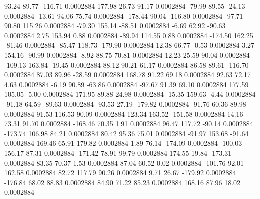        93.24       89.77     -116.71     0.0002884
      177.98       26.73       91.17     0.0002884
      -79.99       89.55      -24.13     0.0002884
      -13.61       94.06       75.74     0.0002884
     -178.44       90.04     -116.80     0.0002884
      -97.71       90.80      115.26     0.0002884
      -79.30      155.14      -88.51     0.0002884
       -6.69       62.92      -90.63     0.0002884
        2.75      153.94        0.88     0.0002884
      -89.94      114.55        0.88     0.0002884
     -174.50      162.25      -81.46     0.0002884
      -85.47      118.73     -179.90     0.0002884
       12.38       66.77       -0.53     0.0002884
        3.27      154.16      -90.99     0.0002884
       -8.92       88.75       70.81     0.0002884
       12.23       25.59       90.04     0.0002884
     -109.13      163.84      -19.45     0.0002884
       88.12       90.21       61.17     0.0002884
       86.58       89.61     -116.70     0.0002884
       87.03       89.96      -28.59     0.0002884
      168.78       91.22       69.18     0.0002884
       92.63       72.17        4.63     0.0002884
       -6.19       90.89      -63.86     0.0002884
      -97.67       91.39       69.10     0.0002884
      177.59      105.05       -5.00     0.0002884
      171.95       89.88       24.98     0.0002884
      -15.35      159.63       -4.44     0.0002884
      -91.18       64.59      -89.63     0.0002884
      -93.53       27.19     -179.82     0.0002884
      -91.76       60.36       89.98     0.0002884
       91.53      116.53       90.09     0.0002884
      123.34      163.52     -151.58     0.0002884
       14.16       73.31       91.70     0.0002884
     -168.46       70.35        1.91     0.0002884
       96.47      117.72      -90.14     0.0002884
     -173.74      106.98       84.21     0.0002884
       80.42       95.36       75.01     0.0002884
      -91.97      153.68      -91.64     0.0002884
      169.46       65.91      179.82     0.0002884
        1.89       76.14     -174.09     0.0002884
     -100.03      156.17       87.31     0.0002884
     -171.42       78.91       99.79     0.0002884
      174.55       19.84     -173.31     0.0002884
       83.35       70.37        1.53     0.0002884
       87.04       60.52        0.02     0.0002884
     -101.76       92.01      162.58     0.0002884
       82.72      117.79       90.26     0.0002884
        9.71       26.67     -179.92     0.0002884
     -176.84       68.02       88.83     0.0002884
       84.90       71.22       85.23     0.0002884
      168.16       87.96       18.02     0.0002884
